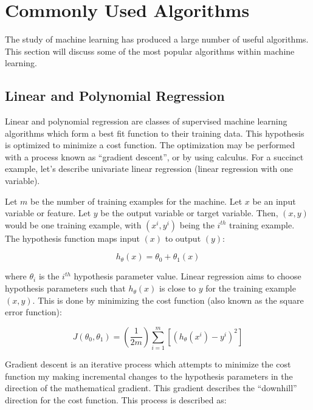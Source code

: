 \section{Commonly Used Algorithms} %

The study of machine learning has produced a large number of useful algorithms. This section will discuss some of the most popular algorithms within machine learning. 


\subsection{Linear and Polynomial Regression}

Linear and polynomial regression are classes of supervised machine learning algorithms which form a best fit function to their training data. This hypothesis is optimized to minimize a cost function. The optimization may be performed with a process known as ``gradient descent'', or by using calculus. \cite{website:ng} For a succinct example, let's describe univariate linear regression (linear regression with one variable). 

Let \(m\) be the number of training examples for the machine. Let \(x\) be an input variable or feature. Let \(y\) be the output variable or target variable. Then, \((x, y)\) would be one training example, with \((x^i, y^i)\) being the \(i^{th}\) training example. The hypothesis function maps input \((x)\) to output \((y)\): 

\[h_\theta(x) = \theta_0 + \theta_1(x)\]

where \(\theta_i\) is the \(i^{th}\) hypothesis parameter value. Linear regression aims to choose hypothesis parameters such that \(h_\theta(x)\) is close to \(y\) for the training example \((x, y)\). This is done by minimizing the cost function (also known as the square error function):

\[J(\theta_0,\theta_1) = (\frac{1}{2m})\sum_{i=1}^m[(h_\theta(x^i) - y^i)^2]\]

Gradient descent is an iterative process which attempts to minimize the cost function my making incremental changes to the hypothesis parameters in the direction of the mathematical gradient. This gradient describes the ``downhill'' direction for the cost function. This process is described as:

